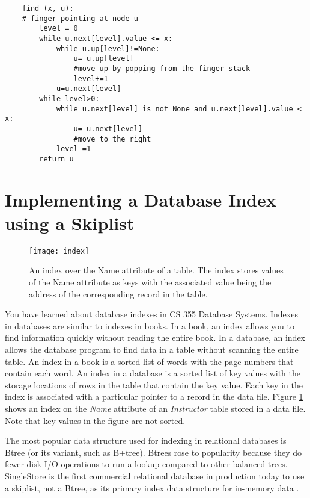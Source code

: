 \documentclass[addpoints]{exam}
\begin{document}
\begin{questions}
\begin{solution}
\begin{verbatim}
    find (x, u):
    # finger pointing at node u
        level = 0
        while u.next[level].value <= x:
            while u.up[level]!=None:
                u= u.up[level]
                #move up by popping from the finger stack
                level+=1
            u=u.next[level]
        while level>0:
            while u.next[level] is not None and u.next[level].value < x:
                u= u.next[level]
                #move to the right
            level-=1
        return u
    \end{verbatim}
  \end{solution}


\end{questions}

\newpage
\part{Implementing a Database Index using a Skiplist}

\begin{figure}[!h]
  \centering
  \texttt{[image: index]}
  \caption{An index over the Name attribute of a table. The index stores values of the Name attribute as keys with the associated value being the address of the corresponding record in the table.}
  \label{fig:index}
\end{figure}

You have learned about database indexes in CS 355 Database Systems. Indexes in databases are similar to indexes in books. In a book, an index allows you to find information quickly without reading the entire book. In a database, an index allows the database program to find data in a table without scanning the entire table. An index in a book is a sorted list of words with the page numbers that contain each word. An index in a database is a sorted list of key values with the storage locations of rows in the table that contain the key value. Each key in the index is associated with a particular pointer to a record in the data file. Figure \ref{fig:index} shows an index on the \textit{Name} attribute of an \textit{Instructor} table stored in a data file. Note that key values in the figure are not sorted.

The most popular data structure used for indexing in relational databases is Btree (or its variant, such as B+tree). Btrees rose to popularity because they do fewer disk I/O operations to run a lookup compared to other balanced trees. SingleStore is the first commercial relational database in production today to use a skiplist, not a Btree, as its primary index data structure for in-memory data \cite{singlestore}.
\end{document}
